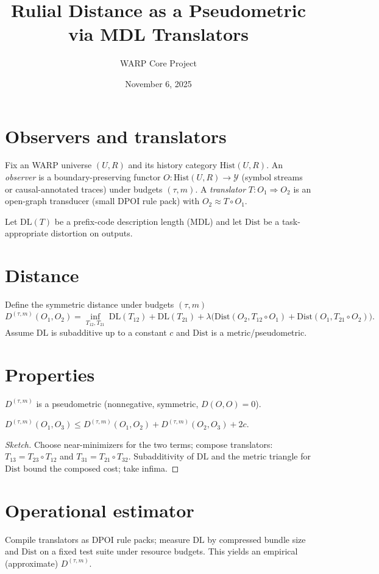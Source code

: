 \documentclass[11pt]{article}
\title{Rulial Distance as a Pseudometric via MDL Translators}
\author{WARP Core Project}
\date{November 6, 2025}
\begin{document}
\maketitle

\section{Observers and translators}
Fix an WARP universe $(U,R)$ and its history category $\mathrm{Hist}(U,R)$.
An \emph{observer} is a boundary-preserving functor $O:\mathrm{Hist}(U,R)\to \mathcal{Y}$ (symbol streams or causal-annotated traces) under budgets $(\tau,m)$.
A \emph{translator} $T:O_1\Rightarrow O_2$ is an open-graph transducer (small DPOI rule pack) with $O_2\approx T\circ O_1$.

Let $\mathrm{DL}(T)$ be a prefix-code description length (MDL) and let $\mathrm{Dist}$ be a task-appropriate distortion on outputs.

\section{Distance}
Define the symmetric distance under budgets $(\tau,m)$
\[
D^{(\tau,m)}(O_1,O_2)=\inf_{T_{12},T_{21}}\ \mathrm{DL}(T_{12})+\mathrm{DL}(T_{21})
+\lambda\big(\mathrm{Dist}(O_2,T_{12}\circ O_1)+\mathrm{Dist}(O_1,T_{21}\circ O_2)\big).
\]
Assume $\mathrm{DL}$ is subadditive up to a constant $c$ and $\mathrm{Dist}$ is a metric/pseudometric.

\section{Properties}
\begin{proposition}[Pseudometric]
$D^{(\tau,m)}$ is a pseudometric (nonnegative, symmetric, $D(O,O)=0$).
\end{proposition}

\begin{theorem}
$D^{(\tau,m)}(O_1,O_3)\le D^{(\tau,m)}(O_1,O_2)+D^{(\tau,m)}(O_2,O_3)+2c$.
\end{theorem}
\begin{proof}[Sketch]
Choose near-minimizers for the two terms; compose translators: $T_{13}=T_{23}\circ T_{12}$ and $T_{31}=T_{21}\circ T_{32}$. Subadditivity of $\mathrm{DL}$ and the metric triangle for $\mathrm{Dist}$ bound the composed cost; take infima.
\end{proof}

\section{Operational estimator}
Compile translators as DPOI rule packs; measure $\mathrm{DL}$ by compressed bundle size and $\mathrm{Dist}$ on a fixed test suite under resource budgets. This yields an empirical (approximate) $D^{(\tau,m)}$.
\end{document}

